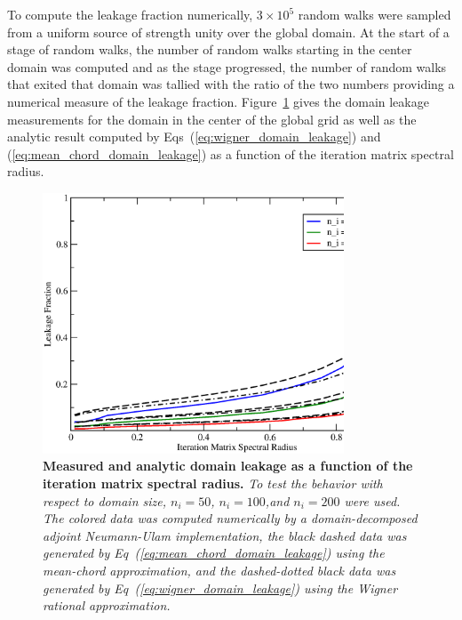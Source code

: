 \documentclass[preprint,11pt]{elsarticle}
\newcommand{\sn}[2]{\ensuremath{#1\times 10^{#2}}}
\begin{document}
To compute the leakage fraction numerically, \sn{3}{5} random walks were
sampled from a uniform source of strength unity over the global domain. At the
start of a stage of random walks, the number of random walks starting in the
center domain was computed and as the stage progressed, the number of random
walks that exited that domain was tallied with the ratio of the two numbers
providing a numerical measure of the leakage
fraction. Figure~\ref{fig:measured_leakage} gives the domain leakage
measurements for the domain in the center of the global grid as well as the
analytic result computed by Eqs~(\ref{eq:wigner_domain_leakage}) and
(\ref{eq:mean_chord_domain_leakage}) as a function of the iteration matrix
spectral radius.
\begin{figure}[ht!]
  \begin{center}
    \includegraphics[width=0.8\textwidth]{leakage_fraction.eps}
  \end{center}
  \caption{\textbf{Measured and analytic domain leakage as a function of the
      iteration matrix spectral radius.} \textit{To test the behavior with
      respect to domain size, $n_i=50$, $n_i=100$,and $n_i=200$ were used. The
      colored data was computed numerically by a domain-decomposed adjoint
      Neumann-Ulam implementation, the black dashed data was generated by
      Eq~(\ref{eq:mean_chord_domain_leakage}) using the mean-chord
      approximation, and the dashed-dotted black data was generated by
      Eq~(\ref{eq:wigner_domain_leakage}) using the Wigner rational
      approximation.}}
  \label{fig:measured_leakage}
\end{figure}
\end{document}

